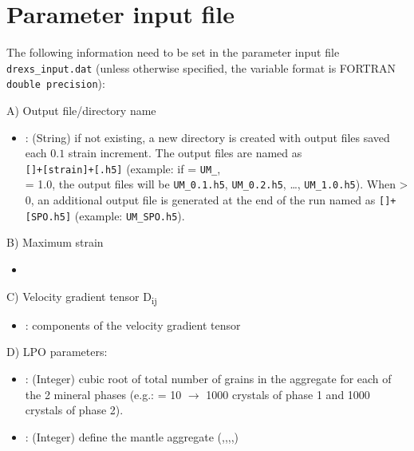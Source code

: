 \section{Parameter input file}

The following information need to be set in the parameter input file \texttt{drexs\_input.dat} (unless otherwise specified, the variable format is FORTRAN \texttt{double precision}):

A) Output file/directory name
\begin{itemize}
    \item {}: (String) if not existing, a new directory is created with output files saved each $0.1$ strain increment. The output files are named as\\ \texttt{[]+[strain]+[.h5]} (example: if  = \texttt{UM\_},\\  = 1.0, the output files will be \texttt{UM\_0.1.h5}, \texttt{UM\_0.2.h5}, \ldots, \texttt{UM\_1.0.h5}). When  > 0, an additional output file is generated at the end of the run named as \texttt{[]+[SPO.h5]} (example: \texttt{UM\_SPO.h5}).
\end{itemize}
\vspace{0.5cm}

B) Maximum strain
\begin{itemize}
    \item {}
\end{itemize}
\vspace{0.5cm}

C) Velocity gradient tensor D\textsubscript{ij}
\begin{itemize}
    \item {}: components of the velocity gradient tensor
    
\end{itemize}
\vspace{0.5cm}

D) LPO parameters:
\begin{itemize}
    \item {}: (Integer) cubic root of total number of grains in the aggregate for each of the 2 mineral phases (e.g.:  = 10 $\rightarrow$ 1000 crystals of phase 1 and 1000 crystals of phase 2). 
    \item {}: (Integer) define the mantle aggregate (,,,,)
\end{itemize}
\vspace{0.5cm}

